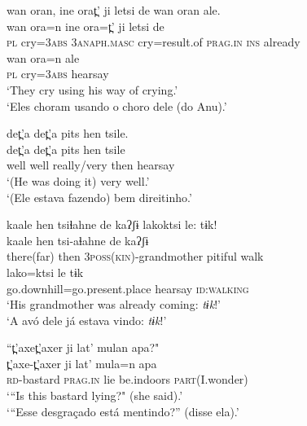 \documentclass[output=paper,
modfonts,nonflat
]{langsci/langscibook}
\begin{document}
\ea wan oran, ine orat̪' ji letsi de wan oran ale.\\[.3em]
\gll wan  ora=n  ine  ora=t̪'  ji letsi de\\
\textsc{pl} cry=\textsc{3abs}  \textsc{3anaph.masc}  cry=result.of \textsc{prag.in} \textsc{ins} already\\



\gll wan  ora=n ale\\
\textsc{pl}   cry=\textsc{3abs}  hearsay\\
\glt `They cry using his way of crying.'\\
‘Eles choram usando o choro dele (do Anu).’{\footnotemark}

\z

\ea det̪'a det̪'a pits hen tsile.\\[.3em]
\gll det̪'a det̪'a  pits hen  tsile\\
well   well   really/very  then hearsay\\
\glt `(He was doing it) very well.'\\
‘(Ele estava fazendo) bem direitinho.’
\z

\ea kaale hen tsiɬahne de kaʔʃɨ lakoktsi le: tɨk!\\[.3em]
\gll kaale  hen  tsi-aɬahne de kaʔʃɨ\\
there(far) then \textsc{3poss(kin)}-grandmother pitiful walk\\



\gll lako=ktsi  le             tɨk\\
go.downhill=go.present.place  hearsay   \textsc{id:walking}\\
\glt `His grandmother was already coming: \textit{tɨk}!'\\
‘A avó dele já estava vindo: \textit{tɨk}!'{\footnotemark}

\z

\ea “t̪'axet̪'axer ji lat' mulan apa?"\\[.3em]
\gll t̪'axe-t̪'axer  ji lat'  mula=n  apa\\
 \textsc{rd}-bastard  \textsc{prag.in}  lie  be.indoors   \textsc{part}(I.wonder)\\
\glt ‘“Is this bastard lying?" (she said).'\\
‘“Esse desgraçado está mentindo?” (disse ela).'
\z
\end{document}
